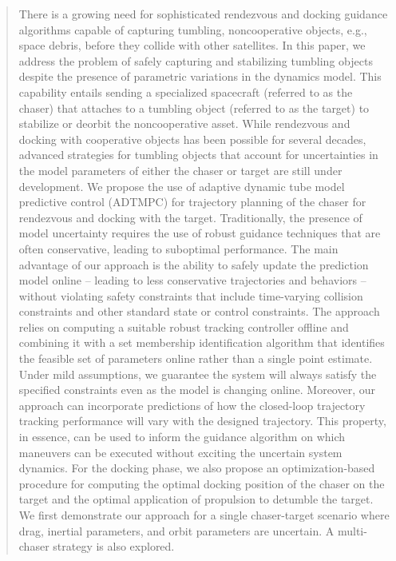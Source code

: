 \begin{abstract}
There is a growing need for sophisticated rendezvous and docking guidance algorithms capable of capturing tumbling, noncooperative objects, e.g., space debris, before they collide with other satellites.
In this paper, we address the problem of safely capturing and stabilizing tumbling objects despite the presence of parametric variations in the dynamics model.
This capability entails sending a specialized spacecraft (referred to as the chaser) that attaches to a tumbling object (referred to as the target) to stabilize or deorbit the noncooperative asset.
While rendezvous and docking with cooperative objects has been possible for several decades, advanced strategies for tumbling objects that account for uncertainties in the model parameters of either the chaser or target are still under development.
We propose the use of adaptive dynamic tube model predictive control (ADTMPC) for trajectory planning of the chaser for rendezvous and docking with the target.
Traditionally, the presence of model uncertainty requires the use of robust guidance techniques that are often conservative, leading to suboptimal performance.
The main advantage of our approach is the ability to safely update the prediction model online -- leading to less conservative trajectories and behaviors -- without violating safety constraints that include time-varying collision constraints and other standard state or control constraints.
The approach relies on computing a suitable robust tracking controller offline and combining it with a set membership identification algorithm that identifies the feasible set of parameters online rather than a single point estimate.
Under mild assumptions, we guarantee the system will always satisfy the specified constraints even as the model is changing online.
Moreover, our approach can incorporate predictions of how the closed-loop trajectory tracking performance will vary with the designed trajectory.
This property, in essence, can be used to inform the guidance algorithm on which maneuvers can be executed without exciting the uncertain system dynamics.
For the docking phase, we also propose an optimization-based procedure for computing the optimal docking position of the chaser on the target and the optimal application of propulsion to detumble the target.
We first demonstrate our approach for a single chaser-target scenario where drag, inertial parameters, and orbit parameters are uncertain.
A multi-chaser strategy is also explored.
\end{abstract}